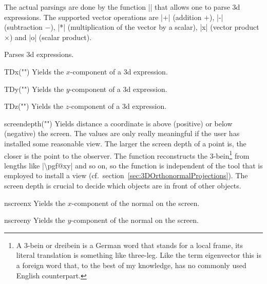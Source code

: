 \documentclass[a4paper,fleqn]{ltxdoc}
\begin{document}
The actual parsings are done by the function |\pgfmathtdparse| that allows one
to parse 3d expressions. The supported vector operations are |+| (addition $+$),
|-| (subtraction $-$), |*| (multiplication of the vector by a scalar), |x|
(vector product $\times$) and |o| (scalar product).

\begin{command}{}
   Parses 3d expressions.
\end{command}

\begin{math-function}{TDx("")}
   Yields the $x$-component of a 3d expression.
\end{math-function}

\begin{math-function}{TDy("")}
   Yields the $y$-component of a 3d expression.
\end{math-function}

\begin{math-function}{TDz("")}
   Yields the $z$-component of a 3d expression.
\end{math-function}


\begin{math-function}{screendepth("")}
   Yields distance a coordinate is above (positive) or below (negative) the
   screen. The values are only really meaningful if the user has installed some
   reasonable view. The larger the screen depth of a point is, the closer is the
   point to the observer. The function reconstructs the 3-bein\footnote{A 3-bein
   or dreibein is a German word that stands for a local frame, its literal
   translation is something like three-leg. Like the term eigenvector this is a
   foreign word that, to the best of my knowledge, has no commonly used English
   counterpart.} from lengths like  |\textbackslash pgf@xy| and so on, so the
   function is independent of the tool that is employed to install a view (cf.\
   section~\ref{sec:3DOrthonormalProjections}). The screen depth is crucial to
   decide which objects are in front of other objects. 
\end{math-function}

\begin{math-function}{nscreenx}
   Yields the $x$-component of the normal on the screen. 
\end{math-function}

\begin{math-function}{nscreeny}
   Yields the $y$-component of the normal on the screen. 
\end{math-function}
\end{document}
